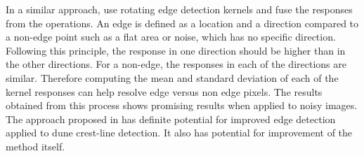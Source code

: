 In a similar approach, \cite{Image_Edge_detection_Rotating_Kernel_Transformation} use rotating edge detection kernels and fuse the responses from the operations. An edge is defined as a location and a direction compared to a non-edge point such as a flat area or noise, which has no specific direction. Following this principle, the response in one direction should be higher than in the other directions. For a non-edge, the	responses in each of the directions are similar. Therefore computing the mean and standard deviation of each of the kernel responses can help resolve edge versus non edge pixels. The results obtained from this process shows promising results when applied to noisy images. The approach proposed in \cite{Image_Edge_detection_Rotating_Kernel_Transformation} has definite potential for improved edge detection applied to dune crest-line detection. It also has potential for improvement of the method itself.

